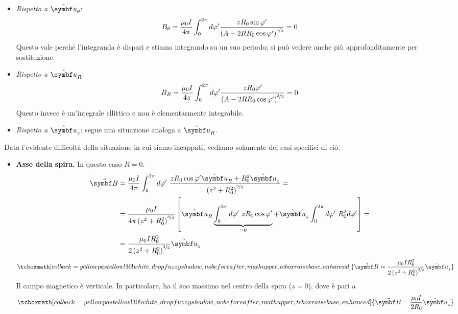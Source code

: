 \begin{itemize}
	\item \textit{Rispetto a }$\vbh{u}_{\theta}$:
	\begin{equation*}
		B_\theta=\frac{\mu_0 I}{4\pi }\int_0^{2\pi}d\phi'\frac{zR_0\sin\phi'}{\left(A-2RR_0\cos\phi'\right)^{\nicefrac{3}{2}}}=0
	\end{equation*}
	Questo vale perché l'integranda è dispari e stiamo integrando su un suo periodo; si può vedere anche più approfonditamente per sostituzione.
	\item \textit{Rispetto a} $\vbh{u}_{R}$:
	\begin{equation*}
		B_R=\frac{\mu_0 I}{4\pi }\int_0^{2\pi}d\phi'\frac{zR_0\phi'}{\left(A-2RR_0\cos\phi'\right)^{\nicefrac{3}{2}}}=0
	\end{equation*}
	Questo invece è un'integrale ellittico e non è elementarmente integrabile.
	\item \textit{Rispetto a} $\vbh{u}_z$: segue una situazione analoga a $\vbh{u}_R$.
\end{itemize}
Data l'evidente difficoltà della situazione in cui siamo incappati, vediamo solamente dei casi specifici di ciò.
\begin{itemize}
	\item \textbf{Asse della spira.} In questo caso $R=0$.
	\begin{align*}
		\vba{B}&=\frac{\mu_0 I}{4\pi }\int_0^{2\pi}d\phi'\ \frac{zR_0\cos\phi'\vbh{u}_R+R_0^2\vbh{u}_z}{\left(z^2+R_0^2\right)^{\nicefrac{3}{2}}}=\\
		&=\frac{\mu_0 I}{4\pi \left(z^2+R_0^2\right)^{\nicefrac{3}{2}}}\left[\vbh{u}_R\underbrace{\int_0^{2\pi}d\phi'\ zR_0\cos\phi'}_{=0} + \vbh{u}_z \int_0^{2\pi}d\phi'\ R_0^2d\phi'\right]=\\
		&=\frac{\mu_0 I R_0^2}{2 \left(z^2+R_0^2\right)^{\nicefrac{3}{2}}}\vbh{u}_z
	\end{align*}
	\begin{equation}
		\tcboxmath[colback=yellowpastellow!30!white, drop fuzzy shadow, nobeforeafter, math upper, tcbox raise base, enhanced]{\vba{B}=\frac{\mu_0 I R_0^2}{2 \left(z^2+R_0^2\right)^{\nicefrac{3}{2}}}\vbh{u}_z}
	\end{equation}
	Il campo magnetico è verticale. In particolare, ha il suo massimo nel centro della spira ($z=0$), dove è pari a
	\begin{equation}
		\tcboxmath[colback=yellowpastellow!30!white, drop fuzzy shadow, nobeforeafter, math upper, tcbox raise base, enhanced]{\vba{B}=\frac{\mu_0 I}{2R_0}\vbh{u}_z}
	\end{equation}
\end{itemize}
